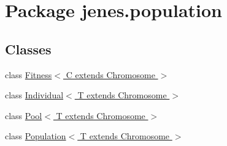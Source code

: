\hypertarget{namespacejenes_1_1population}{\section{Package jenes.\-population}
\label{namespacejenes_1_1population}
}
\subsection*{Classes}
\begin{DoxyCompactItemize}
\item 
class \hyperlink{classjenes_1_1population_1_1_fitness_3_01_c_01extends_01_chromosome_01_4}{Fitness$<$ C extends Chromosome $>$}
\item 
class \hyperlink{classjenes_1_1population_1_1_individual_3_01_t_01extends_01_chromosome_01_4}{Individual$<$ T extends Chromosome $>$}
\item 
class \hyperlink{classjenes_1_1population_1_1_pool_3_01_t_01extends_01_chromosome_01_4}{Pool$<$ T extends Chromosome $>$}
\item 
class \hyperlink{classjenes_1_1population_1_1_population_3_01_t_01extends_01_chromosome_01_4}{Population$<$ T extends Chromosome $>$}
\end{DoxyCompactItemize}
